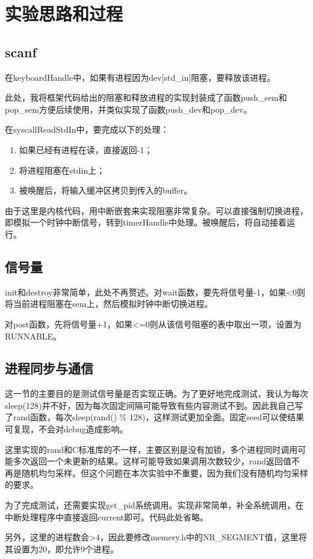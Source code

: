 \documentclass[12pt,a4paper,UTF8]{article}
\begin{document}
\section{实验思路和过程}
\subsection{scanf}
在keyboardHandle中，如果有进程因为dev[std\_in]阻塞，要释放该进程。

\par 此处，我将框架代码给出的阻塞和释放进程的实现封装成了函数push\_sem和pop\_sem方便后续使用，并类似实现了函数push\_dev和pop\_dev。
\par 在syscallReadStdIn中，要完成以下的处理：
\begin{enumerate}
	\item 如果已经有进程在读，直接返回-1；
	\item 将进程阻塞在stdin上；
	\item 被唤醒后，将输入缓冲区拷贝到传入的buffer。
\end{enumerate}
\par 由于这里是内核代码，用中断嵌套来实现阻塞非常复杂。可以直接强制切换进程，即模拟一个时钟中断信号，转到timerHandle中处理。被唤醒后，将自动接着运行。


\subsection{信号量}
init和destroy非常简单，此处不再赘述。对wait函数，要先将信号量-1，如果<0则将当前进程阻塞在sem上，然后模拟时钟中断切换进程。

\par 对post函数，先将信号量+1，如果<=0则从该信号阻塞的表中取出一项，设置为RUNNABLE。


\subsection{进程同步与通信}
这一节的主要目的是测试信号量是否实现正确。为了更好地完成测试，我认为每次sleep(128)并不好，因为每次固定间隔可能导致有些内容测试不到。因此我自己写了rand函数，每次sleep(rand() \% 128)，这样测试更加全面。固定seed可以使结果可复现，不会对debug造成影响。

\par 这里实现的rand和C标准库的不一样，主要区别是没有加锁，多个进程同时调用可能多次返回一个未更新的结果。这样可能导致如果调用次数较少，rand返回值不再是随机均匀采样。但这个问题在本次实验中不重要，因为我们没有随机均匀采样的要求。
\par 为了完成测试，还需要实现get\_pid系统调用。实现非常简单，补全系统调用，在中断处理程序中直接返回current即可。代码此处省略。
\par 另外，这里的进程数会>4，因此要修改memery.h中的NR\_SEGMENT值，这里将其设置为20，即允许9个进程。
\end{document}
